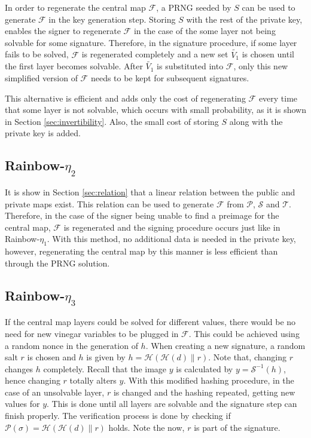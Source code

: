 \documentclass{ufsctex/ufsctex}
\begin{document}
In order to regenerate the central map $\mathcal{F}$, a
PRNG seeded by $S$ can be used to
generate $\mathcal{F}$ in the key generation step. Storing $S$ with the rest of
the private key, enables the signer to regenerate $\mathcal{F}$ in the case of
the some layer not being solvable for some signature. Therefore, in the
signature procedure, if some layer fails to be solved, $\mathcal{F}$ is
regenerated completely and a new set $\tilde{V_1}$ is chosen until the first
layer becomes solvable. After $\tilde{V_1}$ is substituted into $\mathcal{F}$,
only this new simplified version of $\mathcal{F}$ needs to be kept for
subsequent signatures.

This alternative is efficient and adds only the cost of regenerating
$\mathcal{F}$ every time that some layer is not solvable, which occurs with
small probability, as it is shown in Section \ref{sec:invertibility}. Also, the
small cost of storing $S$ along with the private key is added.

\subsection{Rainbow-$\eta_2$}

It is show in Section \ref{sec:relation} that a linear relation between the
public and private maps exist. This relation can be used to generate
$\mathcal{F}$ from $\mathcal{P}$, $\mathcal{S}$ and $\mathcal{T}$. Therefore,
in the case of the signer being unable to find a preimage for the central map,
$\mathcal{F}$ is regenerated and the signing procedure occurs just like in
Rainbow-$\eta_1$. With this method, no additional data is needed in the private
key, however, regenerating the central map by this manner is less efficient
than through the PRNG solution.

\subsection{Rainbow-$\eta_3$}\label{sec:rainboweta3}

If the central map layers could be solved for different values, there would be
no need for new vinegar variables to be plugged in $\mathcal{F}$. This could be
achieved using a random nonce in the generation of $h$. When creating a new
signature, a random salt $r$ is chosen and $h$ is given by $h =
\mathcal{H}(\mathcal{H}(d) \| r)$. Note that, changing $r$ changes $h$
completely. Recall that the image $y$ is calculated by $y =
\mathcal{S}^{-1}(h)$, hence changing $r$ totally alters $y$. With this modified
hashing procedure, in the case of an unsolvable layer, $r$ is changed and the
hashing repeated, getting new values for $y$. This is done until all layers are
solvable and the signature step can finish properly. The verification process
is done by checking if $\mathcal{P}(\sigma) = \mathcal{H}(\mathcal{H}(d) \| r)$
holds. Note the now, $r$ is part of the signature.
\end{document}
